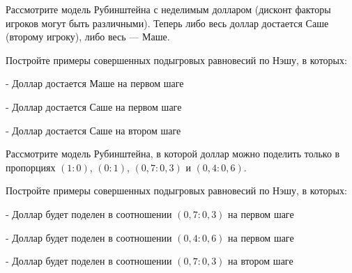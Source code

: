 \begin{problem}\par
\begin{source} \cite{binmore:fg} \end{source}
Рассмотрите модель Рубинштейна с неделимым долларом (дисконт факторы игроков могут быть различными). Теперь либо весь доллар достается Саше (второму игроку), либо весь --- Маше.\par
 Постройте примеры совершенных подыгровых равновесий по Нэшу, в которых:\par
- Доллар достается Маше на первом шаге\par
- Доллар достается Саше на первом шаге\par
- Доллар достается Саше на втором шаге\par



\begin{sol}

\end{sol}
\end{problem}



\begin{problem}
Рассмотрите модель Рубинштейна, в которой доллар можно поделить только в пропорциях  $\left(1:0\right)$,  $\left(0:1\right)$,  $\left(0,7:0,3\right)$  и  $\left(0,4:0,6\right)$.\par
Постройте примеры совершенных подыгровых равновесий по Нэшу, в которых:\par
- Доллар будет поделен в соотношении  $\left(0,7:0,3\right)$  на первом шаге\par
- Доллар будет поделен в соотношении  $\left(0,4:0,6\right)$  на первом шаге\par
- Доллар будет поделен в соотношении  $\left(0,7:0,3\right)$  на втором шаге\par



\begin{sol}

\end{sol}
\end{problem}



